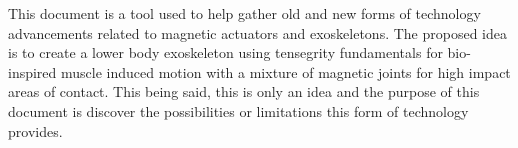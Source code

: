 This document is a tool used to help gather old and new forms of technology advancements related to magnetic actuators and exoskeletons.
The proposed idea is to create a lower body exoskeleton using tensegrity fundamentals for bio-inspired muscle induced motion with a mixture of magnetic joints for high impact areas of contact.
This being said, this is only an idea and the purpose of this document is discover the possibilities or limitations this form of technology provides.